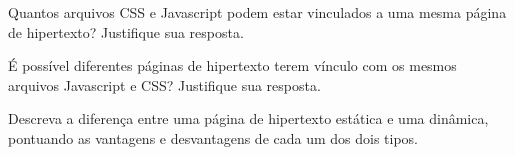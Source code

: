 \begin{exercise}
Quantos arquivos CSS e Javascript podem estar vinculados a uma mesma página de hipertexto? Justifique sua resposta.
\end{exercise}

\begin{exercise}
É possível diferentes páginas de hipertexto terem vínculo com os mesmos arquivos Javascript e CSS? Justifique sua resposta.
\end{exercise}

\begin{exercise}
Descreva a diferença entre uma página de hipertexto estática e uma dinâmica, pontuando as vantagens e desvantagens de cada um dos dois tipos.
\end{exercise}

